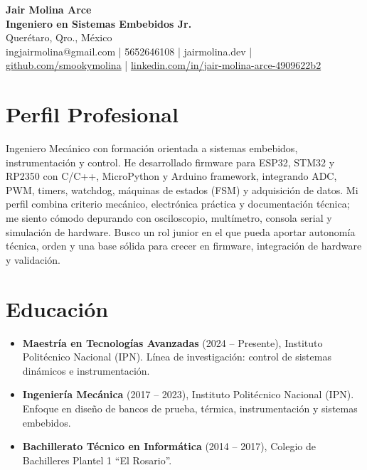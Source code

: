 \documentclass[10pt,a4paper]{article}
\begin{document}
\pagestyle{empty}

\begin{center}
    {\huge \textbf{Jair Molina Arce}} \\
    \vspace{2mm}
    {\Large \textbf{Ingeniero en Sistemas Embebidos Jr.}} \\
    \vspace{2mm}
    Querétaro, Qro., México \\
    ingjairmolina@gmail.com | 5652646108 | jairmolina.dev | \href{https://github.com/smookymolina}{github.com/smookymolina} | \href{https://linkedin.com/in/jair-molina-arce-4909622b2}{linkedin.com/in/jair-molina-arce-4909622b2}
\end{center}

\section*{Perfil Profesional}
Ingeniero Mecánico con formación orientada a sistemas embebidos, instrumentación y control. He desarrollado firmware para ESP32, STM32 y RP2350 con C/C++, MicroPython y Arduino framework, integrando ADC, PWM, timers, watchdog, máquinas de estados (FSM) y adquisición de datos. Mi perfil combina criterio mecánico, electrónica práctica y documentación técnica; me siento cómodo depurando con osciloscopio, multímetro, consola serial y simulación de hardware. Busco un rol junior en el que pueda aportar autonomía técnica, orden y una base sólida para crecer en firmware, integración de hardware y validación.

\section*{Educación}
\begin{itemize}[leftmargin=*, noitemsep]
    \item \textbf{Maestría en Tecnologías Avanzadas} (2024 -- Presente), Instituto Politécnico Nacional (IPN). Línea de investigación: control de sistemas dinámicos e instrumentación.
    \item \textbf{Ingeniería Mecánica} (2017 -- 2023), Instituto Politécnico Nacional (IPN). Enfoque en diseño de bancos de prueba, térmica, instrumentación y sistemas embebidos.
    \item \textbf{Bachillerato Técnico en Informática} (2014 -- 2017), Colegio de Bachilleres Plantel 1 ``El Rosario''.
\end{itemize}
\end{document}
